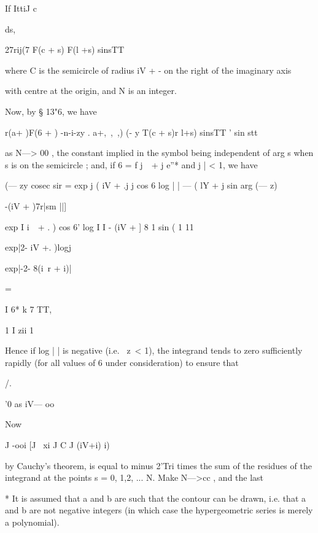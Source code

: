 If IttiJ c



ds,



27rij(7 F(c + s) F(l +s) sinsTT

where C is the semicircle of radius iV + - on the right of the
imaginary axis

with centre at the origin, and N is an integer.

Now, by § 13"6, we have

r(a+ )F(6 + ) -n-i-zy . a+,\ ,\ ,) (- y T(c + s)r l+s) sinsTT ' sin
stt

as N—> 00 , the constant implied in the symbol being independent of
arg s when s is on the semicircle ; and, if 6 = f j\ \ + j e''* and j
| < 1, we have

(— zy cosec sir = exp j ( iV + .j j cos 6 log | | — ( lY + j sin arg
(— z)

-(iV + )7r|sm ||]

exp I i\ \ + . ) cos 6' log I I - (iV + ] 8 1 sin ( 1 11

exp|2- iV +. )logj

exp|-2- 8(i\ r + i)|



=



  I 6* k 7 TT,







1 I zii 1



Hence if log | | is negative (i.e. \ z\ < 1), the integrand tends to
zero sufficiently rapidly (for all values of 6 under consideration) to
ensure that



/.



'0 as iV— oo



Now



J -ooi [J ~xi J C J (iV+i) i)



by Cauchy's theorem, is equal to minus 2'Tri times the sum of the
residues of the integrand at the points s = 0, 1,2, ... N. Make N—>cc
, and the last

* It is assumed that a and b are such that the contour can be drawn,
i.e. that a and b are not negative integers (in which case the
hypergeometric series is merely a polynomial).



